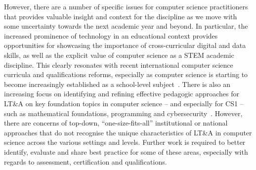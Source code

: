 \documentclass[sigconf]{acmart}
\begin{document}
However, there are a number of specific issues for computer science
practitioners that provides valuable insight and context for the
discipline as we move with some uncertainty towards the next academic
year and beyond. In particular, the increased prominence of technology
in an educational context provides opportunities for showcasing the
importance of cross-curricular digital and data skills, as well as the
explicit value of computer science as a STEM academic discipline. This
clearly resonates with recent international computer science curricula
and qualifications reforms, especially as computer science is starting
to become increasingly established as a school-level
subject~\cite{bell:2014,brown-et-al-toce2014,gal-ezer+stephenson:2014,raman-et-al:2015}.
There is also an increasing focus on identifying and refining
effective pedagogic approaches for LT\&A on key foundation topics in
computer science -- and especially for CS1 -- such as mathematical
foundations, programming and
cybersecurity~\cite{davenport-et-al:latice2016,murphy-et-al:programming2017,simon-et-al:sigcse2018,crick-et-al:fie2019,davenport+crick:fmfun2019,prickett-et-al:iticse2020,crick-et-al:fie2020}. However,
there are concerns of top-down, ``one-size-fits-all'' institutional or
national approaches that do not recognise the unique characteristics
of LT\&A in computer science across the various settings and
levels. Further work is required to better identify, evaluate and
share best practice for some of these areas, especially with regards
to assessment, certification and qualifications.

\end{document}
